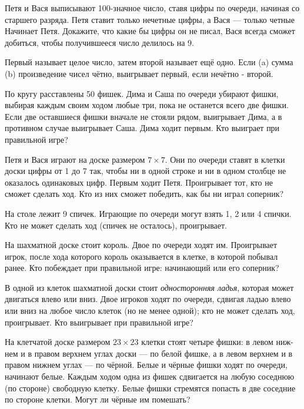 \documentclass{article}
\begin{document}
\begin{enumerate_boxed}
        \item Петя и Вася выписывают 100-значное число, ставя цифры по очереди, начиная со старшего разряда.
        Петя ставит только нечетные цифры, а Вася — только четные Начинает Петя.
        Докажите, что какие бы цифры он не писал, Вася всегда сможет добиться, чтобы получившееся число делилось на 9.

        \item Первый называет целое число, затем второй называет ещё одно.
        Если (a) сумма (b) произведение чисел чётно, выигрывает первый, если нечётно - второй.

        \item По кругу расставлены 50 фишек.
        Дима и Саша по очереди убирают фишки, выбирая каждым своим ходом любые три, пока не останется всего две фишки.
        Если две оставшиеся фишки вначале не стояли рядом, выигрывает Дима, а в противном случае выигрывает Саша.
        Дима ходит первым.
        Кто выиграет при правильной игре?

        \item Петя и Вася играют на доске размером $7 \times 7$.
        Они по очереди ставят в клетки доски цифры от 1 до 7 так, чтобы ни в одной строке и ни в одном столбце не оказалось одинаковых цифр.
        Первым ходит Петя.
        Проигрывает тот, кто не сможет сделать ход.
        Кто из них сможет победить, как бы ни играл соперник?

        \item  На столе лежит 9 спичек.
        Играющие по очереди могут взять 1, 2 или 4 спички.
        Кто не может сделать ход (спичек не осталось), проигрывает.

        \item На шахматной доске стоит король.
        Двое по очереди ходят им.
        Проигрывает игрок, после хода которого король оказывается в клетке, в которой побывал ранее.
        Кто побеждает при правильной игре: начинающий или его соперник?

        \item В одной из клеток шахматной доски стоит \textit{односторонняя ладья}, которая может двигаться влево или вниз.
        Двое игроков ходят по очереди, сдвигая ладью влево или вниз на любое число клеток (но не менее одной); кто не может сделать ход, проигрывает.
        Кто выигрывает при правильной игре?

        \item На клетчатой доске размером $23 \times 23$ клетки стоят четыре фишки: в левом ниж- нем и в правом верхнем углах доски — по белой фишке, а в левом верхнем и в правом нижнем углах — по чёрной.
        Белые и чёрные фишки ходят по очереди, начинают белые.
        Каждым ходом одна из фишек сдвигается на любую соседнюю (по стороне) свободную клетку.
        Белые фишки стремятся попасть в две соседние по стороне клетки.
        Могут ли чёрные им помешать?


\end{enumerate_boxed}
\end{document}
